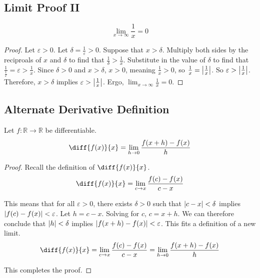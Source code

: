 \documentclass[11pt]{article}
\begin{document}
    \subsection{Limit Proof II}
        \label{thm:0.2}
        \begin{equation}
            \lim_{x \to \infty} \frac{1}{x} = 0
        \end{equation}
        \begin{proof}
            Let $\varepsilon > 0$.
            Let $\delta = \frac{1}{\varepsilon} > 0$.
            Suppose that $x > \delta$.
            Multiply both sides by the reciproals of $x$ and $\delta$ to find that $\frac{1}{\delta} > \frac{1}{x}$.
            Substitute in the value of $\delta$ to find that $\frac{1}{\frac{1}{\varepsilon}} = \varepsilon > \frac{1}{x}$.
            Since $\delta > 0$ and $x > \delta$, $x > 0$, meaning $\frac{1}{x} > 0$, so $\frac{1}{x} = \left| \frac{1}{x} \right|$.
            So $\varepsilon > \left| \frac{1}{x} \right|$.
            Therefore, $x > \delta$ implies $\varepsilon > \left| \frac{1}{x} \right|$.
            Ergo, $\lim_{x \to \infty} \frac{1}{x} = 0$.
        \end{proof}

    \subsection{Alternate Derivative Definition}
        \label{thm:0.3}
        Let $f: \mathbb{R} \to \mathbb{R}$ be differentiable.
        \begin{equation}
            \diff{f(x)}{x} = \lim_{h \to 0} \frac{f(x + h) - f(x)}{h}
        \end{equation}
        \begin{proof}
            Recall the definition of $\diff{f(x)}{x}$.
            \begin{equation}
                \diff{f(x)}{x} = \lim_{c \to x} \frac{f(c) - f(x)}{c - x}
            \end{equation}

            This means that for all $\varepsilon > 0$, there exists $\delta > 0$ such that $\left| c - x \right| < \delta$ implies $\left| f(c) - f(x) \right| < \varepsilon$.
            Let $h = c - x$.
            Solving for $c$, $c = x + h$.
            We can therefore conclude that $\left| h \right| < \delta$ implies $\left| f(x + h) - f(x) \right| < \varepsilon$.
            This fits a definition of a new limit.
            \begin{equation}
                \diff{f(x)}{x} = \lim_{c \to x} \frac{f(c) - f(x)}{c - x} = \lim_{h \to 0} \frac{f(x + h) - f(x)}{h}
            \end{equation}
            
            This completes the proof.
        \end{proof}
\end{document}
